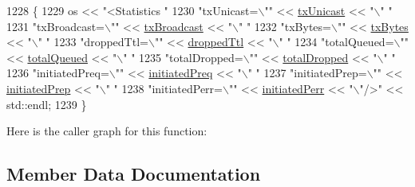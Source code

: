 \begin{DoxyCode}
1228 \{
1229   os << \textcolor{stringliteral}{"<Statistics "}
1230   \textcolor{stringliteral}{"txUnicast=\(\backslash\)""} << \hyperlink{structns3_1_1dot11s_1_1HwmpProtocol_1_1Statistics_a7d9d31219b5c2b3a713ba09ddd43044a}{txUnicast} << \textcolor{stringliteral}{"\(\backslash\)" "}
1231   \textcolor{stringliteral}{"txBroadcast=\(\backslash\)""} << \hyperlink{structns3_1_1dot11s_1_1HwmpProtocol_1_1Statistics_a49bb09b5b0893eebcc853b112afff30f}{txBroadcast} << \textcolor{stringliteral}{"\(\backslash\)" "}
1232   \textcolor{stringliteral}{"txBytes=\(\backslash\)""} << \hyperlink{structns3_1_1dot11s_1_1HwmpProtocol_1_1Statistics_a507c7a9383e255dd2402d42c8218b416}{txBytes} << \textcolor{stringliteral}{"\(\backslash\)" "}
1233   \textcolor{stringliteral}{"droppedTtl=\(\backslash\)""} << \hyperlink{structns3_1_1dot11s_1_1HwmpProtocol_1_1Statistics_ae53d393593feddd05de8b1a68793237a}{droppedTtl} << \textcolor{stringliteral}{"\(\backslash\)" "}
1234   \textcolor{stringliteral}{"totalQueued=\(\backslash\)""} << \hyperlink{structns3_1_1dot11s_1_1HwmpProtocol_1_1Statistics_a23f321f49ba13d78a633fd374383378b}{totalQueued} << \textcolor{stringliteral}{"\(\backslash\)" "}
1235   \textcolor{stringliteral}{"totalDropped=\(\backslash\)""} << \hyperlink{structns3_1_1dot11s_1_1HwmpProtocol_1_1Statistics_a10f7af4034c326fc11df2942321e36f2}{totalDropped} << \textcolor{stringliteral}{"\(\backslash\)" "}
1236   \textcolor{stringliteral}{"initiatedPreq=\(\backslash\)""} << \hyperlink{structns3_1_1dot11s_1_1HwmpProtocol_1_1Statistics_ae6bc34aa4c7963585fdd71ef98f8d6b5}{initiatedPreq} << \textcolor{stringliteral}{"\(\backslash\)" "}
1237   \textcolor{stringliteral}{"initiatedPrep=\(\backslash\)""} << \hyperlink{structns3_1_1dot11s_1_1HwmpProtocol_1_1Statistics_a18504cfe812c31cd4c7f5d711de5da91}{initiatedPrep} << \textcolor{stringliteral}{"\(\backslash\)" "}
1238   \textcolor{stringliteral}{"initiatedPerr=\(\backslash\)""} << \hyperlink{structns3_1_1dot11s_1_1HwmpProtocol_1_1Statistics_adfc0a8fb77c92acd199b86028dcd7dfb}{initiatedPerr} << \textcolor{stringliteral}{"\(\backslash\)"/>"} << std::endl;
1239 \}
\end{DoxyCode}


Here is the caller graph for this function\+:




\subsection{Member Data Documentation}
